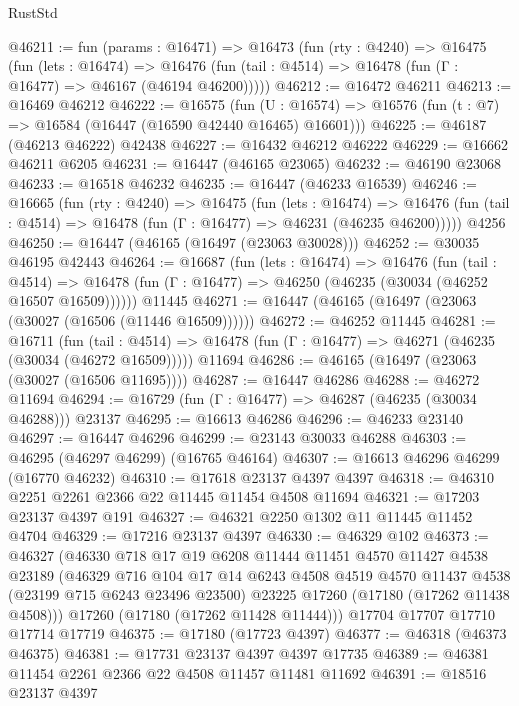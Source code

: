 \begin{lexlean}{RustStd}
\begin{coremodule}
@46211 := fun (params : @16471) =>
  @16473
    (fun (rty : @4240) =>
    @16475
      (fun (lets : @16474) =>
      @16476 (fun (tail : @4514) => @16478 (fun (Γ : @16477) => @46167 (@46194 @46200)))))
@46212 := @16472 @46211
@46213 := @16469 @46212
@46222 := @16575
    (fun (U : @16574) => @16576 (fun (t : @7) => @16584 (@16447 (@16590 @42440 @16465) @16601)))
@46225 := @46187 (@46213 @46222) @42438
@46227 := @16432 @46212 @46222
@46229 := @16662 @46211 @6205
@46231 := @16447 (@46165 @23065)
@46232 := @46190 @23068
@46233 := @16518 @46232
@46235 := @16447 (@46233 @16539)
@46246 := @16665
    (fun (rty : @4240) =>
    @16475
      (fun (lets : @16474) =>
      @16476 (fun (tail : @4514) => @16478 (fun (Γ : @16477) => @46231 (@46235 @46200)))))
    @4256
@46250 := @16447 (@46165 (@16497 (@23063 @30028)))
@46252 := @30035 @46195 @42443
@46264 := @16687
    (fun (lets : @16474) =>
    @16476
      (fun (tail : @4514) =>
      @16478 (fun (Γ : @16477) => @46250 (@46235 (@30034 (@46252 @16507 @16509))))))
    @11445
@46271 := @16447 (@46165 (@16497 (@23063 (@30027 (@16506 (@11446 @16509))))))
@46272 := @46252 @11445
@46281 := @16711
    (fun (tail : @4514) => @16478 (fun (Γ : @16477) => @46271 (@46235 (@30034 (@46272 @16509)))))
    @11694
@46286 := @46165 (@16497 (@23063 (@30027 (@16506 @11695))))
@46287 := @16447 @46286
@46288 := @46272 @11694
@46294 := @16729 (fun (Γ : @16477) => @46287 (@46235 (@30034 @46288))) @23137
@46295 := @16613 @46286
@46296 := @46233 @23140
@46297 := @16447 @46296
@46299 := @23143 @30033 @46288
@46303 := @46295 (@46297 @46299) (@16765 @46164)
@46307 := @16613 @46296 @46299 (@16770 @46232)
@46310 := @17618 @23137 @4397 @4397
@46318 := @46310 @2251 @2261 @2366 @22 @11445 @11454 @4508 @11694
@46321 := @17203 @23137 @4397 @191
@46327 := @46321 @2250 @1302 @11 @11445 @11452 @4704
@46329 := @17216 @23137 @4397
@46330 := @46329 @102
@46373 := @46327
    (@46330
      @718
      @17
      @19
      @6208
      @11444
      @11451
      @4570
      @11427
      @4538
      @23189
      (@46329
        @716
        @104
        @17
        @14
        @6243
        @4508
        @4519
        @4570
        @11437
        @4538
        (@23199 @715 @6243 @23496 @23500)
        @23225
        @17260
        (@17180 (@17262 @11438 @4508)))
      @17260
      (@17180 (@17262 @11428 @11444)))
    @17704
    @17707
    @17710
    @17714
    @17719
@46375 := @17180 (@17723 @4397)
@46377 := @46318 (@46373 @46375)
@46381 := @17731 @23137 @4397 @4397 @17735
@46389 := @46381 @11454 @2261 @2366 @22 @4508 @11457 @11481 @11692
@46391 := @18516 @23137 @4397

\end{coremodule}
\end{lexlean}
